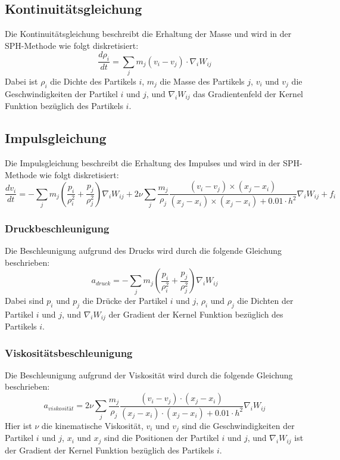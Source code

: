 \documentclass[a4paper, 12pt]{article}
\begin{document}
\subsection{Kontinuitätsgleichung}
Die Kontinuitätsgleichung beschreibt die Erhaltung der Masse und wird in der SPH-Methode wie folgt diskretisiert:
\[
\frac{d\rho_i}{dt} = \sum_j m_j (v_i - v_j) \cdot \nabla_i W_{ij}
\]
Dabei ist \(\rho_i\) die Dichte des Partikels \(i\), \(m_j\) die Masse des Partikels \(j\), \(v_i\) und \(v_j\) die Geschwindigkeiten der Partikel \(i\) und \(j\), und \(\nabla_i W_{ij}\) das Gradientenfeld der Kernel Funktion bezüglich des Partikels \(i\).

\subsection{Impulsgleichung}
Die Impulsgleichung beschreibt die Erhaltung des Impulses und wird in der SPH-Methode wie folgt diskretisiert:
\[
\frac{d v_i}{dt} = -\sum_j m_j \left( \frac{p_i}{\rho_i^2} + \frac{p_j}{\rho_j^2} \right) \nabla_i W_{ij} + 2 \nu \sum_j \frac{m_j}{\rho_j} \frac{(v_i - v_j) \times (x_j - x_i)}{(x_j - x_i) \times (x_j - x_i) + 0.01\cdot h^2} \nabla_i W_{ij} + f_i
\]

\subsubsection{Druckbeschleunigung}
Die Beschleunigung aufgrund des Drucks wird durch die folgende Gleichung \cite{monaghan1992smoothed} beschrieben:
\begin{equation} \label{equ:druckBesch}
	a_{druck} = -\sum_j m_j \left( \frac{p_i}{\rho_i^2} + \frac{p_j}{\rho_j^2} \right) \nabla_i W_{ij}
\end{equation}
Dabei sind \( p_i \) und \( p_j \) die Drücke der Partikel \( i \) und \( j \), \(\rho_i \) und \(\rho_j \) die Dichten der Partikel \( i \) und \( j \), und \( \nabla_i W_{ij} \) der Gradient der Kernel Funktion bezüglich des Partikels \( i \).

\subsubsection{Viskositätsbeschleunigung}
Die Beschleunigung aufgrund der Viskosität wird durch die folgende Gleichung \cite{monaghan1992smoothed} beschrieben:
\begin{equation} \label{equ:viskositätBesch}
	a_{viskosität} = 2 \nu \sum_j \frac{m_j}{\rho_j} \frac{(v_i - v_j) \cdot (x_j - x_i)}{(x_j - x_i) \cdot (x_j - x_i) + 0.01\cdot h^2} \nabla_i W_{ij}
\end{equation}
Hier ist \(\nu\) die kinematische Viskosität, \( v_i \) und \( v_j \) sind die Geschwindigkeiten der Partikel \( i \) und \( j \), \( x_i \) und \( x_j \) sind die Positionen der Partikel \( i \) und \( j \), und \(\nabla_i W_{ij}\) ist der Gradient der Kernel Funktion bezüglich des Partikels \( i \).
\end{document}
